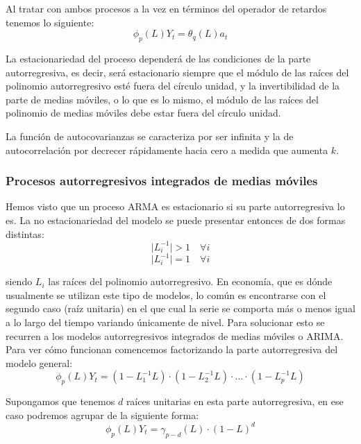 Al tratar con ambos procesos a la vez en términos del operador de retardos tenemos lo siguiente:
\begin{equation}
    \phi_{p}(L)Y_{t} = \theta_{q}(L)a_{t}
\end{equation}

La estacionariedad del proceso dependerá de las condiciones de la parte autorregresiva, es decir, será estacionario siempre que el módulo de las raíces del polinomio autorregresivo esté fuera del círculo unidad, y la invertibilidad de la parte de medias móviles, o lo que es lo mismo, el módulo de las raíces del polinomio de medias móviles debe estar fuera del círculo unidad.

La función de autocovarianzas se caracteriza por ser infinita y la de autocorrelación por decrecer rápidamente hacia cero a medida que aumenta $k$.

\subsubsection{Procesos autorregresivos integrados de medias móviles}
Hemos visto que un proceso ARMA es estacionario si su parte autorregresiva lo es. La no estacionariedad del modelo se puede presentar entonces de dos formas distintas:
\begin{equation}
\mid L_{i}^{-1}\mid > 1 \quad \forall{i}
\end{equation}
\begin{equation}
\mid L_{i}^{-1}\mid = 1 \quad \forall{i}
\end{equation}

\noindent siendo $L_{i}$ las raíces del polinomio autorregresivo. En economía, que es dónde usualmente se utilizan este tipo de modelos, lo común es encontrarse con el segundo caso (raíz unitaria) en el que cual la serie se comporta más o menos igual a lo largo del tiempo variando únicamente de nivel. Para solucionar esto se recurren a los modelos autorregresivos integrados de medias móviles o ARIMA. Para ver cómo funcionan comencemos factorizando la parte autorregresiva del modelo general:
\begin{equation}
\phi_{p}(L)Y_{t} = (1-L_{1}^{-1}L)\cdot(1-L_{2}^{-1}L)\cdot...\cdot(1-L_{p}^{-1}L)
\end{equation}

Supongamos que tenemos $d$ raíces unitarias en esta parte autorregresiva, en ese caso podremos agrupar de la siguiente forma:
\begin{equation}
\phi_{p}(L)Y_{t} = \gamma_{p-d}(L)\cdot(1-L)^{d}
\end{equation}

